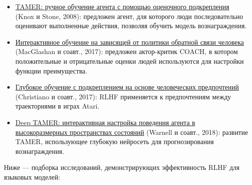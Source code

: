 \documentclass[11pt,a4paper]{article}
\begin{document}
\begin{itemize}
\item
  \href{https://www.cs.utexas.edu/~pstone/Papers/bib2html-links/ICDL08-knox.pdf}{TAMER: ручное обучение агента с помощью оценочного подкрепления} (Knox и Stone, 2008): предложен агент, для которого люди последовательно оценивают выполненные действия, позволяя обучить модель вознаграждения.
\item
  \href{http://proceedings.mlr.press/v70/macglashan17a/macglashan17a.pdf}{Интерактивное обучение на зависящей от политики обратной связи человека} (MacGlashan и соавт., 2017): предложен актор-критик COACH, в котором положительные и отрицательные оценки людей используются для настройки функции преимущества.
\item
  \href{https://proceedings.neurips.cc/paper/2017/hash/d5e2c0adad503c91f91df240d0cd4e49-Abstract.html}{Глубокое обучение с подкреплением на основе человеческих предпочтений} (Christiano и соавт., 2017): RLHF применяется к предпочтениям между траекториями в играх Atari.
\item
  \href{https://ojs.aaai.org/index.php/AAAI/article/view/11485}{Deep TAMER: интерактивная настройка поведения агента в высокоразмерных пространствах состояний} (Warnell и соавт., 2018): развитие TAMER, использующее глубокую нейросеть для прогнозирования вознаграждения.
\end{itemize}

Ниже --- подборка исследований, демонстрирующих эффективность RLHF для языковых моделей:
\end{document}
